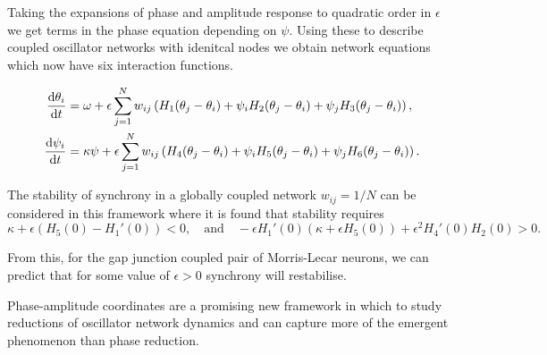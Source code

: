 \documentclass[11pt]{article}
\begin{document}
Taking the expansions of phase and amplitude response to quadratic order
in \(\epsilon\) we get terms in the phase equation depending on
\(\psi\). Using these to describe coupled oscillator networks with
idenitcal nodes we obtain network equations which now have six
interaction functions.

\begin{align*} \frac{{\rm d}\theta_i}{{\rm d} t} &= \omega + \epsilon \sum_{j=1}^N w_{ij} \left( H_1(\theta_j -\theta_i) + \psi_i H_2(\theta_j -\theta_i) + \psi_j H_3(\theta_j -\theta_i) \right),\\
\frac{{\rm d}\psi_i}{{\rm d} t} &= \kappa \psi + \epsilon \sum_{j=1}^N w_{ij} \left( H_4(\theta_j -\theta_i) + \psi_i H_5(\theta_j -\theta_i) + \psi_j H_6(\theta_j -\theta_i) \right).\end{align*}

The stability of synchrony in a globally coupled network \(w_{ij}=1/N\)
can be considered in this framework where it is found that stability
requires
\[ \kappa + \epsilon(H_5(0) - H_1'(0))<0 ,\quad \mbox{and} \quad -\epsilon H_1'(0) \left(\kappa + \epsilon H_5(0) \right) + \epsilon^2 H_4'(0) H_2(0)>0.\]

From this, for the gap junction coupled pair of Morris-Lecar neurons, we
can predict that for some value of \(\epsilon>0\) synchrony will
restabilise.

Phase-amplitude coordinates are a promising new framework in which to
study reductions of oscillator network dynamics and can capture more of
the emergent phenomenon than phase reduction.





\end{document}
